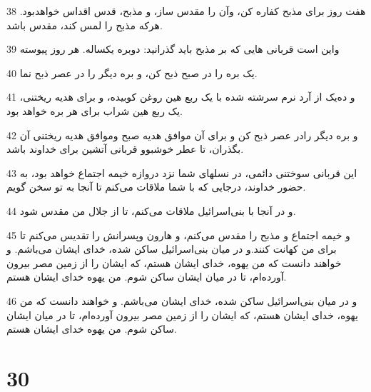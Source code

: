 \par 38 هفت روز برای مذبح کفاره کن، وآن را مقدس ساز، و مذبح، قدس اقداس خواهدبود. هر‌که مذبح را لمس کند، مقدس باشد.
\par 39 واین است قربانی هایی که بر مذبح باید گذرانید: دوبره یکساله. هر روز پیوسته
\par 40 یک بره را در صبح ذبح کن، و بره دیگر را در عصر ذبح نما.
\par 41 و ده‌یک از آرد نرم سرشته شده با یک ربع هین روغن کوبیده، و برای هدیه ریختنی، یک ربع هین شراب برای هر بره خواهد بود.
\par 42 و بره دیگر رادر عصر ذبح کن و برای آن موافق هدیه صبح وموافق هدیه ریختنی آن بگذران، تا عطر خوشبوو قربانی آتشین برای خداوند باشد.
\par 43 این قربانی سوختنی دائمی، در نسلهای شما نزد دروازه خیمه اجتماع خواهد بود، به حضور خداوند، درجایی که با شما ملاقات می‌کنم تا آنجا به تو سخن گویم.
\par 44 و در آنجا با بنی‌اسرائیل ملاقات می‌کنم، تا از جلال من مقدس شود.
\par 45 و خیمه اجتماع و مذبح را مقدس می‌کنم، و هارون وپسرانش را تقدیس می‌کنم تا برای من کهانت کنند.و در میان بنی‌اسرائیل ساکن شده، خدای ایشان می‌باشم. و خواهند دانست که من یهوه، خدای ایشان هستم، که ایشان را از زمین مصر بیرون آورده‌ام، تا در میان ایشان ساکن شوم. من یهوه خدای ایشان هستم.
\par 46 و در میان بنی‌اسرائیل ساکن شده، خدای ایشان می‌باشم. و خواهند دانست که من یهوه، خدای ایشان هستم، که ایشان را از زمین مصر بیرون آورده‌ام، تا در میان ایشان ساکن شوم. من یهوه خدای ایشان هستم.
 
\chapter{30}


